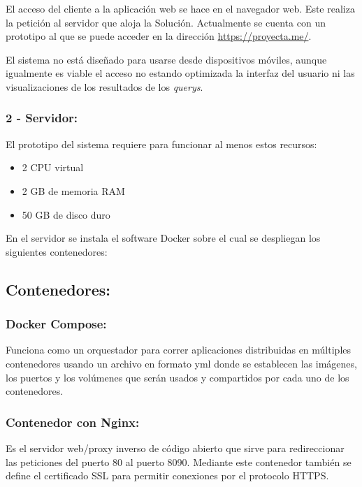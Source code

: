 \documentclass[
  10,
  spanish,
  openany]{book}
\providecommand{\tightlist}{%
  \setlength{\itemsep}{0pt}\setlength{\parskip}{0pt}}
\begin{document}
El acceso del cliente a la aplicación web se hace en el navegador web. Este realiza la petición al servidor que aloja la Solución. Actualmente se cuenta con un prototipo al que se puede acceder en la dirección \url{https://proyecta.me/}.

El sistema no está diseñado para usarse desde dispositivos móviles, aunque igualmente es viable el acceso no estando optimizada la interfaz del usuario ni las visualizaciones de los resultados de los \emph{querys}.

\hypertarget{servidor}{%
\subsubsection{2 - Servidor:}\label{servidor}}

El prototipo del sistema requiere para funcionar al menos estos recursos:

\begin{itemize}
\tightlist
\item
  2 CPU virtual
\item
  2 GB de memoria RAM
\item
  50 GB de disco duro
\end{itemize}

En el servidor se instala el software Docker sobre el cual se despliegan los siguientes contenedores:

\hypertarget{contenedores}{%
\subsection{Contenedores:}\label{contenedores}}

\hypertarget{docker-compose}{%
\subsubsection{Docker Compose:}\label{docker-compose}}

Funciona como un orquestador para correr aplicaciones distribuidas en múltiples contenedores usando un archivo en formato yml donde se establecen las imágenes, los puertos y los volúmenes que serán usados y compartidos por cada uno de los contenedores.

\hypertarget{contenedor-con-nginx}{%
\subsubsection{Contenedor con Nginx:}\label{contenedor-con-nginx}}

Es el servidor web/proxy inverso de código abierto que sirve para redireccionar las peticiones del puerto 80 al puerto 8090. Mediante este contenedor también se define el certificado SSL para permitir conexiones por el protocolo HTTPS.
\end{document}
